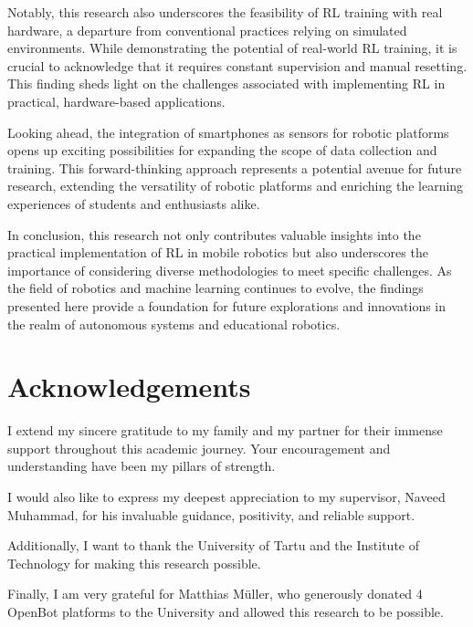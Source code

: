 \documentclass[12pt]{report}
\begin{document}
Notably, this research also underscores the feasibility of RL training with real hardware, a departure from conventional practices relying on simulated environments. While demonstrating the potential of real-world RL training, it is crucial to acknowledge that it requires constant supervision and manual resetting. This finding sheds light on the challenges associated with implementing RL in practical, hardware-based applications.

Looking ahead, the integration of smartphones as sensors for robotic platforms opens up exciting possibilities for expanding the scope of data collection and training. This forward-thinking approach represents a potential avenue for future research, extending the versatility of robotic platforms and enriching the learning experiences of students and enthusiasts alike.

In conclusion, this research not only contributes valuable insights into the practical implementation of RL in mobile robotics but also underscores the importance of considering diverse methodologies to meet specific challenges. As the field of robotics and machine learning continues to evolve, the findings presented here provide a foundation for future explorations and innovations in the realm of autonomous systems and educational robotics.
\chapter*{Acknowledgements}

I extend my sincere gratitude to my family and my partner for their immense support throughout this academic journey. Your encouragement and understanding have been my pillars of strength.

\vspace{10pt}
\noindent I would also like to express my deepest appreciation to my supervisor, Naveed Muhammad, for his invaluable guidance, positivity, and reliable support. 

\vspace{10pt}
\noindent Additionally, I want to thank the University of Tartu and the Institute of Technology for making this research possible.

\vspace{10pt}
\noindent Finally, I am very grateful for Matthias Müller, who generously donated 4 OpenBot platforms to the University and allowed this research to be possible.
\end{document}
